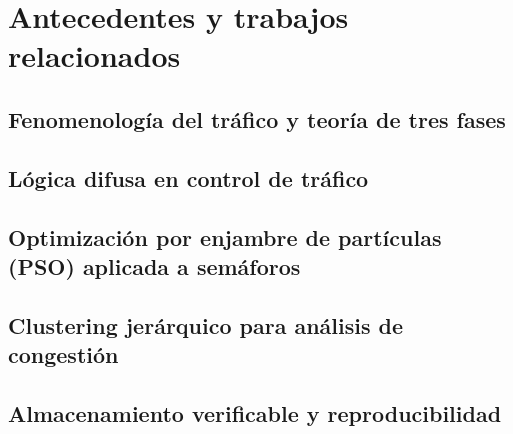\section{Antecedentes y trabajos relacionados}\label{sec:related}

\subsection{Fenomenología del tráfico y teoría de tres fases}\label{subsec:related-kerner}

\subsection{Lógica difusa en control de tráfico}\label{subsec:related-fis}

\subsection{Optimización por enjambre de partículas (PSO) aplicada a semáforos}\label{subsec:related-pso}

\subsection{Clustering jerárquico para análisis de congestión}\label{subsec:related-hc}

\subsection{Almacenamiento verificable y reproducibilidad}\label{subsec:related-storage}
